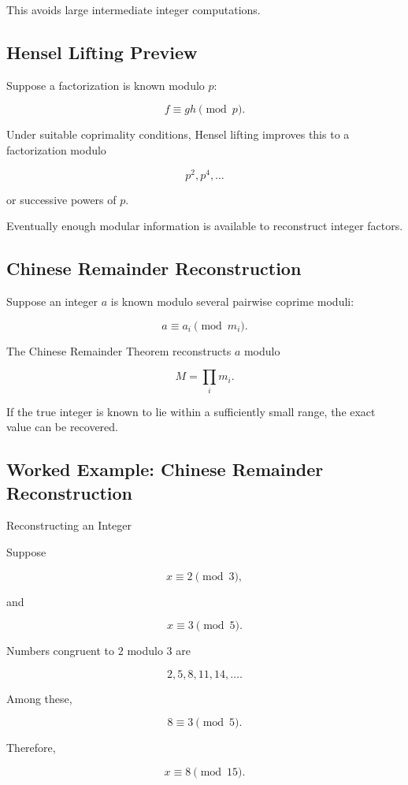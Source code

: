 This avoids large intermediate integer computations.

\subsection{Hensel Lifting Preview}
\label{subsec:hensel-lifting}

Suppose a factorization is known modulo \(p\):

\[
\boxed{
f
\equiv
gh
\pmod p.
}
\]

Under suitable coprimality conditions, Hensel lifting improves this to a
factorization modulo

\[
\boxed{
p^2,
p^4,
\ldots
}
\]

or successive powers of \(p\).

Eventually enough modular information is available to reconstruct integer
factors.

\subsection{Chinese Remainder Reconstruction}
\label{subsec:chinese-remainder-reconstruction}

Suppose an integer \(a\) is known modulo several pairwise coprime moduli:

\[
a\equiv a_i\pmod{m_i}.
\]

The Chinese Remainder Theorem reconstructs \(a\) modulo

\[
\boxed{
M
=
\prod_i m_i.
}
\]

If the true integer is known to lie within a sufficiently small range, the
exact value can be recovered.

\subsection{Worked Example: Chinese Remainder Reconstruction}
\label{subsec:worked-chinese-remainder}

\begin{workedexamplebox}{Reconstructing an Integer}

Suppose

\[
x\equiv2\pmod3,
\]

and

\[
x\equiv3\pmod5.
\]

Numbers congruent to \(2\) modulo \(3\) are

\[
2,5,8,11,14,\ldots.
\]

Among these,

\[
8\equiv3\pmod5.
\]

Therefore,

\begin{answerbox}
\[
\boxed{
x\equiv8\pmod{15}.
}
\]
\end{answerbox}

\end{workedexamplebox}

